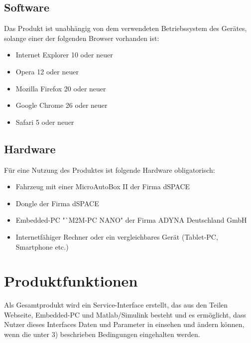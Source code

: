 \documentclass[fontsize = 12pt, paper = a4]{scrreprt}
\begin{document}
\section{Software}

Das Produkt ist unabhängig von dem verwendeten Betriebssystem des Gerätes, solange einer der folgenden \gls{Browser} vorhanden ist:   
     
\begin {itemize}
\item Internet Explorer 10 oder neuer
\item Opera 12 oder neuer
\item Mozilla Firefox 20 oder neuer
\item Google Chrome 26 oder neuer
\item Safari 5 oder neuer
\end{itemize}


\section{Hardware}

Für eine Nutzung des Produktes ist folgende Hardware obligatorisch:
            
\begin{itemize}
\item Fahrzeug mit einer \gls{MicroAutoBox II} der Firma dSPACE
\item \gls{Dongle} der Firma dSPACE
\item \gls{Embedded-PC} "`M2M-PC NANO" der Firma  ADYNA Deutschland GmbH
\item Internetfähiger Rechner oder ein vergleichbares Gerät (\gls{Tablet-PC}, \gls{Smartphone} etc.) 
\end{itemize}


\chapter{Produktfunktionen}



Als Gesamtprodukt wird ein \gls{Service-Interface}  erstellt, das aus den Teilen Webseite, \gls{Embedded-PC}  und \gls{Matlab/Simulink} besteht und es ermöglicht, dass Nutzer dieses \gls{Interface}s Daten und Parameter in  einsehen und ändern können, wenn die unter 3) beschrieben Bedingungen eingehalten werden. 
\end{document}
